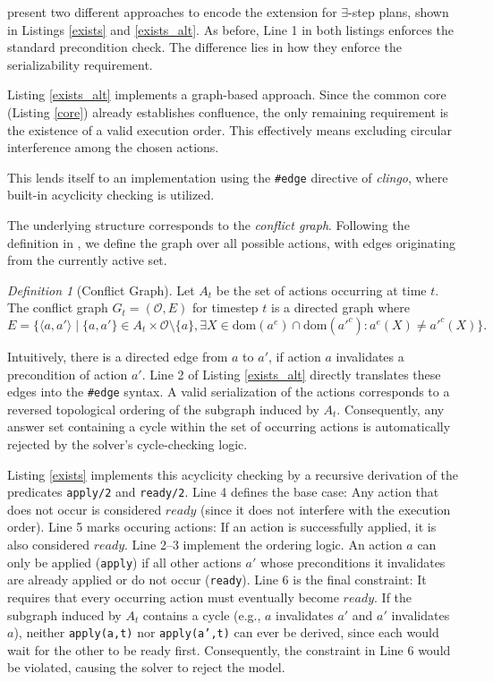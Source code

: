 \documentclass[
     11pt,                    %
     a4paper,             %
     BCOR=10mm,     %
     DIV=14,                 %
     listof=totoc,                    %
     bibliography=totoc,       %
     index=totoc,              %
     parskip            %
     twoside,
     headsepline
     ]{scrreprt}
\theoremstyle{definition}
\theoremstyle{definition}
\theoremstyle{remark}
\theoremstyle{bfnote}
\newtheorem{defi}{Definition}
\newcommand{\dom}{\mathrm{dom}}
\begin{document}
\textcite{DIMOPOULOS_2019} present two different approaches to encode the extension for $\exists$-step plans, shown in Listings \ref{exists} and \ref{exists_alt}.
As before, Line 1 in both listings enforces the standard precondition check.
The difference lies in how they enforce the serializability requirement.

Listing \ref{exists_alt} implements a graph-based approach.
Since the common core (Listing \ref{core}) already establishes confluence, the only remaining requirement is the existence of a valid execution order. This effectively means excluding circular interference among the chosen actions.

This lends itself to an implementation using the \texttt{\#edge} directive \parencite{gebser_et_al:OASIcs.ICLP.2016.2} of \textit{clingo}, where built-in acyclicity checking \parencite{bomanson2016} is utilized.

The underlying structure corresponds to the \textit{conflict graph}. Following the definition in \textcite{DIMOPOULOS_2019}, we define the graph over all possible actions, with edges originating from the currently active set.
\begin{defi}[Conflict Graph]
  Let $A_t$ be the set of actions occurring at time $t$. The conflict graph $G_t = (\mathcal{O}, E)$ for timestep $t$ is a directed graph where
  \[
    E = \{\langle a, a' \rangle \mid \{a, a'\} \in A_t \times \mathcal{O} \setminus \{a\}, \exists X \in \dom(a^e) \cap \dom(a'^c): a^e(X) \ne a'^c(X)\}.
  \]
\end{defi}
Intuitively, there is a directed edge from $a$ to $a'$, if action $a$ invalidates a precondition of action $a'$.
Line 2 of Listing \ref{exists_alt} directly translates these edges into the \texttt{\#edge} syntax. 
A valid serialization of the actions corresponds to a reversed topological ordering of the subgraph induced by $A_t$.
Consequently, any answer set containing a cycle within the set of occurring actions is automatically rejected by the solver's cycle-checking logic.

Listing \ref{exists} implements this acyclicity checking by a recursive derivation of the predicates \texttt{apply/2} and \texttt{ready/2}. 
Line 4 defines the base case: Any action that does not occur is considered $ready$ (since it does not interfere with the execution order). Line 5 marks occuring actions: If an action is successfully applied, it is also considered $ready$.
Line 2--3 implement the ordering logic. An action $a$ can only be applied (\texttt{apply}) if all other actions $a'$ whose preconditions it invalidates are already applied or do not occur (\texttt{ready}). 
Line 6 is the final constraint: It requires that every occurring action must eventually become $ready$.
If the subgraph induced by $A_t$ contains a cycle (e.g., $a$ invalidates $a'$ and $a'$ invalidates $a$), neither \texttt{apply(a,t)} nor \texttt{apply(a',t)} can ever be derived, since each would wait for the other to be ready first. Consequently, the constraint in Line 6 would be violated, causing the solver to reject the model.
\end{document}
